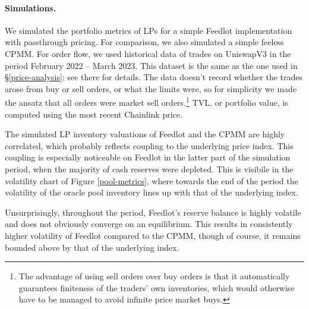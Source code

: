 \documentclass[a4paper,10pt]{article}
\theoremstyle{remark}
\begin{document}
\paragraph{Simulations.}

We simulated the portfolio metrics of LPs for a simple Feedlot implementation with passthrough pricing.
%
For comparison, we also simulated a simple feeless CPMM.
%
For order flow, we used historical data of trades on UniswapV3 in the period February 2022 -- March 2023.
%
This dataset is the same as the one used in \S\ref{price-analysis}; see there for details.
%
The data doesn't record whether the trades arose from buy or sell orders, or what the limits were, so for simplicity we made the ansatz that all orders were market sell orders.\footnote{The advantage of using sell orders over buy orders is that it automatically guarantees finiteness of the traders' own inventories, which would otherwise have to be managed to avoid infinite price market buys.}
%
TVL, or portfolio value, is computed using the most recent Chainlink price.

The simulated LP inventory valuations of Feedlot and the CPMM are highly correlated, which probably reflects coupling to the underlying price index.
%
This coupling is especially noticeable on Feedlot in the latter part of the simulation period, when the majority of cash reserves were depleted.
%
This is visibile in the volatility chart of Figure \ref{pool-metrics}, where towards the end of the period the volatility of the oracle pool inventory lines up with that of the underlying index.

Unsurprisingly, throughout the period, Feedlot's reserve balance is highly volatile and does not obviously converge on an equilibrium.
%
This results in consistently higher volatility of Feedlot compared to the CPMM, though of course, it remains bounded above by that of the underlying index.
\end{document}

